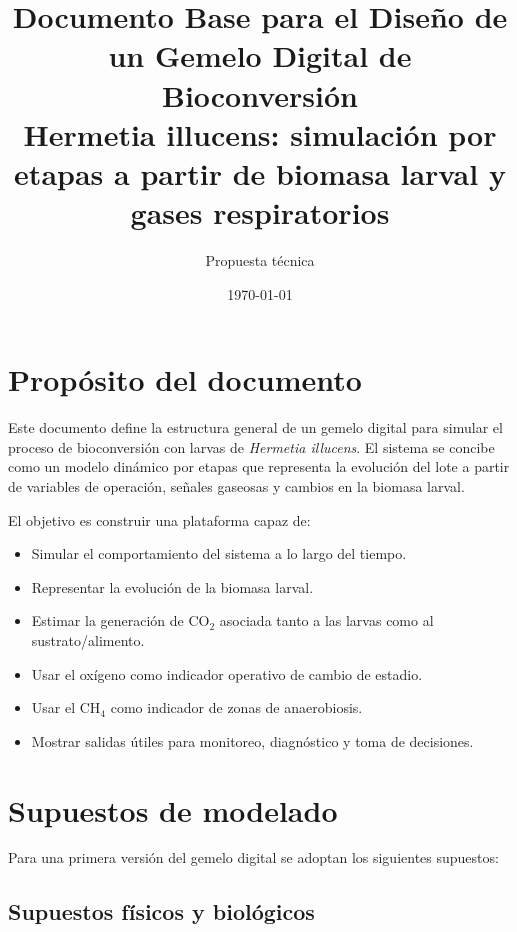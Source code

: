 \documentclass[12pt,a4paper]{report}
\title{\textbf{Documento Base para el Diseño de un Gemelo Digital de Bioconversión}\\
\vspace{0.3cm}
\large Hermetia illucens: simulación por etapas a partir de biomasa larval y gases respiratorios}
\author{Propuesta técnica}
\date{\today}
\begin{document}
\maketitle
\tableofcontents
\newpage

\chapter{Propósito del documento}

Este documento define la estructura general de un gemelo digital para simular el proceso de bioconversión con larvas de \textit{Hermetia illucens}. El sistema se concibe como un modelo dinámico por etapas que representa la evolución del lote a partir de variables de operación, señales gaseosas y cambios en la biomasa larval.

El objetivo es construir una plataforma capaz de:
\begin{itemize}[leftmargin=0.7cm]
    \item Simular el comportamiento del sistema a lo largo del tiempo.
    \item Representar la evolución de la biomasa larval.
    \item Estimar la generación de CO$_2$ asociada tanto a las larvas como al sustrato/alimento.
    \item Usar el oxígeno como indicador operativo de cambio de estadio.
    \item Usar el CH$_4$ como indicador de zonas de anaerobiosis.
    \item Mostrar salidas útiles para monitoreo, diagnóstico y toma de decisiones.
\end{itemize}

\chapter{Supuestos de modelado}

Para una primera versión del gemelo digital se adoptan los siguientes supuestos:

\section{Supuestos físicos y biológicos}
\end{document}
